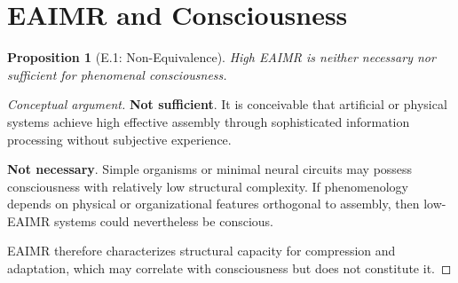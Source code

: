 \documentclass[11pt,letterpaper]{article}
\newtheorem{proposition}{Proposition}
\begin{document}
\section{EAIMR and Consciousness}

\begin{proposition}[E.1: Non-Equivalence]
High EAIMR is neither necessary nor sufficient for phenomenal consciousness.
\end{proposition}

\begin{proof}[Conceptual argument]
\textbf{Not sufficient}. It is conceivable that artificial or physical systems achieve high effective assembly through sophisticated information processing without subjective experience.

\textbf{Not necessary}. Simple organisms or minimal neural circuits may possess consciousness with relatively low structural complexity. If phenomenology depends on physical or organizational features orthogonal to assembly, then low-EAIMR systems could nevertheless be conscious.

EAIMR therefore characterizes structural capacity for compression and adaptation, which may correlate with consciousness but does not constitute it.
\end{proof}
\end{document}
